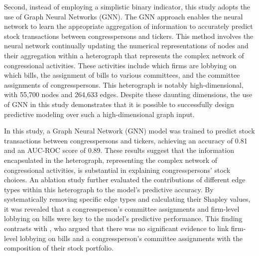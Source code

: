 \documentclass[15pt,letterpaper]{article}
\begin{document}
Second, instead of employing a simplistic binary indicator, this study adopts the use of Graph Neural Networks (GNN). The GNN approach enables the neural network to learn the appropriate aggregation of information to accurately predict stock transactions between congresspersons and tickers. This method involves the neural network continually updating the numerical representations of nodes and their aggregation within a heterograph that represents the complex network of congressional activities. These activities include which firms are lobbying on which bills, the assignment of bills to various committees, and the committee assignments of congresspersons. 
This heterograph is notably high-dimensional, with 55,700 nodes and 264,633 edges. Despite these daunting dimensions, the use of GNN in this study demonstrates that it is possible to successfully design predictive modeling over such a high-dimensional graph input. 


In this study, a Graph Neural Network (GNN) model was trained to predict stock transactions between congresspersons and tickers, achieving an accuracy of 0.81 and an AUC-ROC score of 0.89. These results suggest that the information encapsulated in the heterograph, representing the complex network of congressional activities, is substantial in explaining congresspersons' stock choices. An ablation study further evaluated the contributions of different edge types within this heterograph to the model's predictive accuracy. By systematically removing specific edge types and calculating their Shapley values, it was revealed that a congressperson’s committee assignments and firm-level lobbying on bills were key to the model's predictive performance. This finding contrasts with \cite{eg14}, who argued that there was no significant evidence to link firm-level lobbying on bills and a congressperson’s committee assignments with the composition of their stock portfolio.
\end{document}

